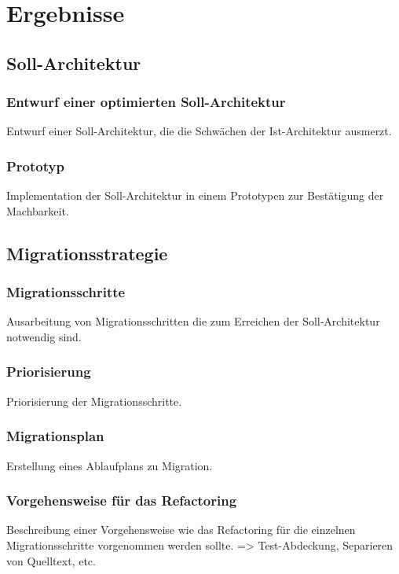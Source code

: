 \chapter{Ergebnisse}



\section{Soll-Architektur}
% 
\subsection{Entwurf einer optimierten Soll-Architektur}
Entwurf einer Soll-Architektur, die die Schwächen der Ist-Architektur ausmerzt.

\subsection{Prototyp}
Implementation der Soll-Architektur in einem Prototypen zur Bestätigung der Machbarkeit.

\section{Migrationsstrategie}
\subsection{Migrationsschritte}
Ausarbeitung von Migrationsschritten die zum Erreichen der Soll-Architektur notwendig sind.

\subsection{Priorisierung}
Priorisierung der Migrationsschritte.

\subsection{Migrationsplan}
Erstellung eines Ablaufplans zu Migration.

\subsection{Vorgehensweise für das Refactoring}
Beschreibung einer Vorgehensweise wie das Refactoring für die einzelnen Migrationsschritte vorgenommen werden sollte.
=> Test-Abdeckung, Separieren von Quelltext, etc.
